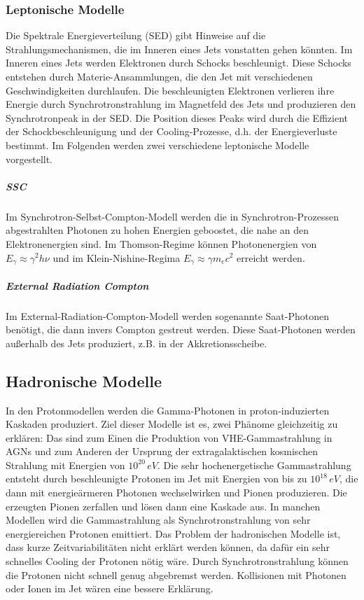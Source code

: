 \subsubsection{Leptonische Modelle}
Die Spektrale Energieverteilung (SED) gibt Hinweise auf die Strahlungsmechanismen, die im Inneren eines Jets vonstatten gehen könnten.
Im Inneren eines Jets werden Elektronen durch Schocks beschleunigt. 
Diese Schocks entstehen durch Materie-Ansammlungen, die den Jet mit verschiedenen Geschwindigkeiten durchlaufen.
Die beschleunigten Elektronen verlieren ihre Energie durch Synchrotronstrahlung im Magnetfeld des Jets und produzieren den Synchrotronpeak in der SED.
Die Position dieses Peaks wird durch die Effizient der Schockbeschleunigung und der Cooling-Prozesse, d.h. der Energieverluste bestimmt. 
Im Folgenden werden zwei verschiedene leptonische Modelle vorgestellt.\cite{Weekes}

\subparagraph{SSC}
Im Synchrotron-Selbst-Compton-Modell werden die in Synchrotron-Prozessen abgestrahlten Photonen zu hohen Energien geboostet, die nahe an den Elektronenergien sind.
Im Thomson-Regime können Photonenergien von $E_{\gamma}\approx \gamma^2 h \nu$ und im Klein-Nishine-Regima $E_{\gamma}\approx \gamma m_e c^2$ erreicht werden.\cite{Weekes}

\subparagraph{External Radiation Compton}
Im External-Radiation-Compton-Modell werden sogenannte Saat-Photonen benötigt, die dann invers Compton gestreut werden.
Diese Saat-Photonen werden außerhalb des Jets produziert, z.B. in der Akkretionsscheibe.\cite{Weekes}

\subsection{Hadronische Modelle}
In den Protonmodellen werden die Gamma-Photonen in proton-induzierten Kaskaden produziert. 
Ziel dieser Modelle ist es, zwei Phänome gleichzeitig zu erklären: 
Das sind zum Einen die Produktion von VHE-Gammastrahlung in AGNs und zum Anderen der Ursprung der extragalaktischen kosmischen Strahlung mit Energien von $10^{20}\,\si{eV}$.
Die sehr hochenergetische Gammastrahlung entsteht durch beschleunigte Protonen im Jet mit Energien von bis zu $10^{18}\,\si{eV}$, die dann mit energieärmeren Photonen wechselwirken und Pionen produzieren.
Die erzeugten Pionen zerfallen und lösen dann eine Kaskade aus.
In manchen Modellen wird die Gammastrahlung als Synchrotronstrahlung von sehr energiereichen Protonen emittiert.
Das Problem der hadronischen Modelle ist, dass kurze Zeitvariabilitäten nicht erklärt werden können, da dafür ein sehr schnelles Cooling der Protonen nötig wäre. 
Durch Synchrotronstrahlung können die Protonen nicht schnell genug abgebremst werden.
Kollisionen mit Photonen oder Ionen im Jet wären eine bessere Erklärung.\cite{Weekes}

